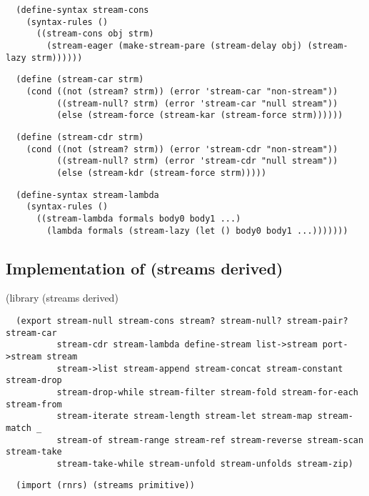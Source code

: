 \begin{verbatim}
  (define-syntax stream-cons
    (syntax-rules ()
      ((stream-cons obj strm)
        (stream-eager (make-stream-pare (stream-delay obj) (stream-lazy strm))))))
\end{verbatim}

\begin{verbatim}
  (define (stream-car strm)
    (cond ((not (stream? strm)) (error 'stream-car "non-stream"))
          ((stream-null? strm) (error 'stream-car "null stream"))
          (else (stream-force (stream-kar (stream-force strm))))))
\end{verbatim}

\begin{verbatim}
  (define (stream-cdr strm)
    (cond ((not (stream? strm)) (error 'stream-cdr "non-stream"))
          ((stream-null? strm) (error 'stream-cdr "null stream"))
          (else (stream-kdr (stream-force strm)))))
\end{verbatim}

\begin{verbatim}
  (define-syntax stream-lambda
    (syntax-rules ()
      ((stream-lambda formals body0 body1 ...)
        (lambda formals (stream-lazy (let () body0 body1 ...)))))))
\end{verbatim}

\subsection{Implementation of (streams
derived)}\label{implementation-of-streams-derived}

(library (streams derived)

\begin{verbatim}
  (export stream-null stream-cons stream? stream-null? stream-pair? stream-car
          stream-cdr stream-lambda define-stream list->stream port->stream stream
          stream->list stream-append stream-concat stream-constant stream-drop
          stream-drop-while stream-filter stream-fold stream-for-each stream-from
          stream-iterate stream-length stream-let stream-map stream-match _
          stream-of stream-range stream-ref stream-reverse stream-scan stream-take
          stream-take-while stream-unfold stream-unfolds stream-zip)
\end{verbatim}

\begin{verbatim}
  (import (rnrs) (streams primitive))
\end{verbatim}

